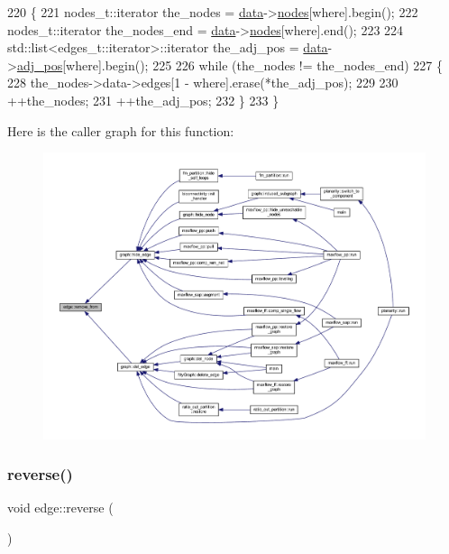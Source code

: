 \begin{DoxyCode}
220 \{
221     nodes\_t::iterator the\_nodes = \mbox{\hyperlink{classedge_a0ebb6dfa28b77f47529085049352b436}{data}}->\mbox{\hyperlink{classedge__data_a870bbbb05de6c5f63d434db624c55dd4}{nodes}}[where].begin();
222     nodes\_t::iterator the\_nodes\_end = \mbox{\hyperlink{classedge_a0ebb6dfa28b77f47529085049352b436}{data}}->\mbox{\hyperlink{classedge__data_a870bbbb05de6c5f63d434db624c55dd4}{nodes}}[where].end();
223 
224     std::list<edges\_t::iterator>::iterator the\_adj\_pos = \mbox{\hyperlink{classedge_a0ebb6dfa28b77f47529085049352b436}{data}}->\mbox{\hyperlink{classedge__data_aa325caa449576727df8042bad875bf43}{adj\_pos}}[where].begin();
225 
226     \textcolor{keywordflow}{while} (the\_nodes != the\_nodes\_end)
227     \{
228         the\_nodes->data->edges[1 - where].erase(*the\_adj\_pos);
229 
230         ++the\_nodes;
231         ++the\_adj\_pos;
232     \}
233 \}
\end{DoxyCode}
Here is the caller graph for this function\+:\nopagebreak
\begin{figure}[H]
\begin{center}
\leavevmode
\includegraphics[width=350pt]{classedge_abcd4eeaf23327d026beac9ee1d0fa7e9_icgraph}
\end{center}
\end{figure}
\mbox{\label{classedge_ad62516eb40dbee9f57a2078cfd97b4c9}} 
\subsubsection{\texorpdfstring{reverse()}{reverse()}}
{\footnotesize\ttfamily void edge\+::reverse (\begin{DoxyParamCaption}{ }\end{DoxyParamCaption})}

